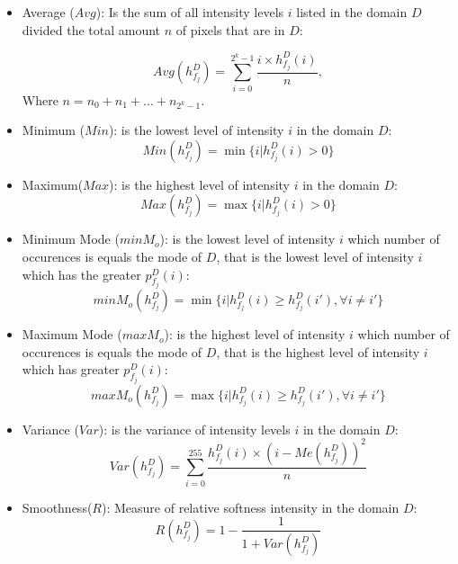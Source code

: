 \begin{itemize}
    \item Average ($Avg$): Is the sum of all intensity levels $i$ listed in the domain $D$ divided the total amount $n$ of pixels that are in $D$:
		
\begin{equation}
\label{promedio}
Avg(h_{f_j}^D) = \sum_{i=0}^{2^k-1}\frac{i\times h_{f_j}^D(i)}{n},
\end{equation}		
Where $n = n_0 + n_1 + ... + n_{2^k-1}$.

    \item Minimum ($Min$): is the lowest level of intensity $i$ in the domain $D$:
\begin{equation}
\label{minimo}
	Min(h_{f_j}^D) = \min\{i|h_{f_j}^D(i)>0\}
\end{equation}

\item Maximum($Max$): is the highest level of intensity $i$ in the domain $D$:
\begin{equation}
\label{maximo}
   Max(h_{f_j}^D) = \max\{i|h_{f_j}^D(i)>0\}
\end{equation}

\item Minimum Mode ($minM_o$): is the lowest level of intensity $i$ which number of occurences is equals the mode of $D$, that is the lowest level of intensity $i$ which has the greater $p_{f_j}^{D}(i)$:
\begin{equation}
\label{ModaMinimo}
   minM_o(h_{f_j}^D) = \min\{i|h_{f_j}^D(i) \geq h_{f_j}^D(i'), \forall i\neq i'\}
\end{equation}

\item Maximum Mode ($maxM_o$): is the highest level of intensity $i$ which number of occurences is  equals the mode of $D$, that is the highest level of intensity $i$ which has greater $p_{f_j}^{D}(i)$:
\begin{equation}
\label{ModaMinimo}
   maxM_o(h_{f_j}^D) = \max\{i|h_{f_j}^D(i) \geq h_{f_j}^D(i'), \forall i\neq i'\}
\end{equation}				
    
		
		\item Variance ($Var$): is the variance of intensity levels $i$ in the domain $D$:
  \begin{equation}
\label{varianza}
   Var(h_{f_j}^D) = \sum_{i=0}^{255}\frac{h_{f_j}^D(i)\times(i - Me(h_{f_j}^D))^2}{n}
\end{equation}		
		\item Smoothness($R$): Measure of relative softness intensity in the domain $D$:
 \begin{equation}
\label{Suavidad}
   R(h_{f_j}^D) = 1-\frac{1}{1+Var(h_{f_j}^D)}
\end{equation}		
		

\end{itemize}


